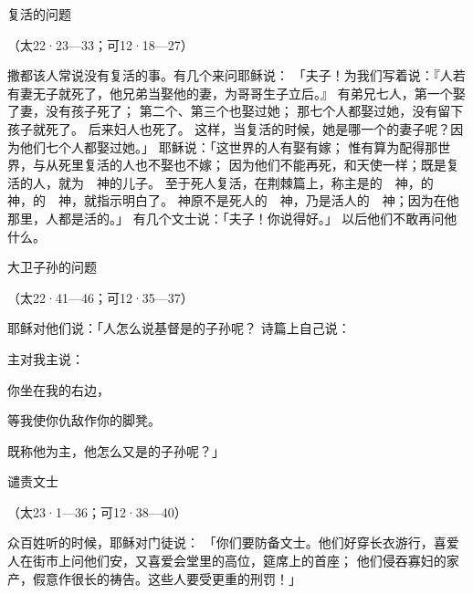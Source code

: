 {\par }{\SH 复活的问题
\par }{\R （太22·23—33；可12·18—27）
\par }{\PP {}撒都该人常说没有复活的事。有几个来问耶稣说：
「夫子！{}为我们写着说：『人若有妻无子就死了，他兄弟当娶他的妻，为哥哥生子立后。』
有弟兄七人，第一个娶了妻，没有孩子死了；
第二个、第三个也娶过她；
那七个人都娶过她，没有留下孩子就死了。
后来妇人也死了。
这样，当复活的时候，她是哪一个的妻子呢？因为他们七个人都娶过她。」
耶稣说：「这世界的人有娶有嫁；
惟有算为配得那世界，与从死里复活的人也不娶也不嫁；
因为他们不能再死，和天使一样；既是复活的人，就为　神的儿子。
至于死人复活，{}在荆棘篇上，称主是{}的　神，{}的　神，{}的　神，就指示明白了。
神原不是死人的　神，乃是活人的　神；因为在他那里，人都是活的。」
有几个文士说：「夫子！你说得好。」
以后他们不敢再问他什么。
\par }{\SH 大卫子孙的问题
\par }{\R （太22·41—46；可12·35—37）
\par }{\PP {}耶稣对他们说：「人怎么说基督是{}的子孙呢？
诗篇上{}自己说：
\par }{\Q 主对我主说：
\par }{\Q 你坐在我的右边，
\par }{\Q {}等我使你仇敌作你的脚凳。
\par }{\PP {}既称他为主，他怎么又是{}的子孙呢？」
\par }{\SH 谴责文士
\par }{\R （太23·1—36；可12·38—40）
\par }{\PP {}众百姓听的时候，耶稣对门徒说：
「你们要防备文士。他们好穿长衣游行，喜爱人在街市上问他们安，又喜爱会堂里的高位，筵席上的首座；
他们侵吞寡妇的家产，假意作很长的祷告。这些人要受更重的刑罚！」

}

